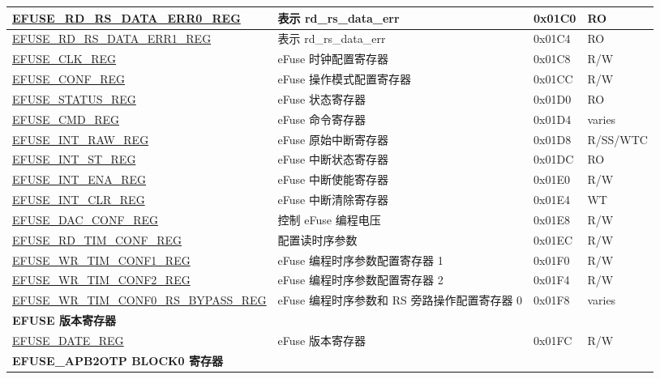 \begin{longtable}{ | p{7cm} | p{6cm} | p{1.2cm} | p{1.5cm} | }
\hyperref[regdesc:EFUSERDRSDATAERR0REG]{EFUSE\_RD\_RS\_DATA\_ERR0\_REG} & 表示 rd\_rs\_data\_err & 0x01C0 & RO \\ \hline
\hyperref[regdesc:EFUSERDRSDATAERR1REG]{EFUSE\_RD\_RS\_DATA\_ERR1\_REG} & 表示 rd\_rs\_data\_err & 0x01C4 & RO \\ \hline
\hyperref[regdesc:EFUSECLKREG]{EFUSE\_CLK\_REG} & eFuse 时钟配置寄存器 & 0x01C8 & R/W \\ \hline
\hyperref[regdesc:EFUSECONFREG]{EFUSE\_CONF\_REG} & eFuse 操作模式配置寄存器 & 0x01CC & R/W \\ \hline
\hyperref[regdesc:EFUSESTATUSREG]{EFUSE\_STATUS\_REG} & eFuse 状态寄存器 & 0x01D0 & RO \\ \hline
\hyperref[regdesc:EFUSECMDREG]{EFUSE\_CMD\_REG} & eFuse 命令寄存器 & 0x01D4 & varies \\ \hline
\hyperref[regdesc:EFUSEINTRAWREG]{EFUSE\_INT\_RAW\_REG} & eFuse 原始中断寄存器 & 0x01D8 & R/SS/WTC \\ \hline
\hyperref[regdesc:EFUSEINTSTREG]{EFUSE\_INT\_ST\_REG} & eFuse 中断状态寄存器 & 0x01DC & RO \\ \hline
\hyperref[regdesc:EFUSEINTENAREG]{EFUSE\_INT\_ENA\_REG} & eFuse 中断使能寄存器 & 0x01E0 & R/W \\ \hline
\hyperref[regdesc:EFUSEINTCLRREG]{EFUSE\_INT\_CLR\_REG} & eFuse 中断清除寄存器 & 0x01E4 & WT \\ \hline
\hyperref[regdesc:EFUSEDACCONFREG]{EFUSE\_DAC\_CONF\_REG} & 控制 eFuse 编程电压 & 0x01E8 & R/W \\ \hline
\hyperref[regdesc:EFUSERDTIMCONFREG]{EFUSE\_RD\_TIM\_CONF\_REG} & 配置读时序参数 & 0x01EC & R/W \\ \hline
\hyperref[regdesc:EFUSEWRTIMCONF1REG]{EFUSE\_WR\_TIM\_CONF1\_REG} & eFuse 编程时序参数配置寄存器 1 & 0x01F0 & R/W \\ \hline
\hyperref[regdesc:EFUSEWRTIMCONF2REG]{EFUSE\_WR\_TIM\_CONF2\_REG} & eFuse 编程时序参数配置寄存器 2 & 0x01F4 & R/W \\ \hline
\hyperref[regdesc:EFUSEWRTIMCONF0RSBYPASSREG]{EFUSE\_WR\_TIM\_CONF0\_RS\_BYPASS\_REG} & eFuse 编程时序参数和 RS 旁路操作配置寄存器 0 & 0x01F8 & varies \\ \hline
\multicolumn{4}{|l|}{\textbf{EFUSE 版本寄存器}} \\ \hline
\hyperref[regdesc:EFUSEDATEREG]{EFUSE\_DATE\_REG} & eFuse 版本寄存器 & 0x01FC & R/W \\ \hline
\multicolumn{4}{|l|}{\textbf{EFUSE\_APB2OTP BLOCK0 寄存器}} \\ \hline

\end{longtable}

